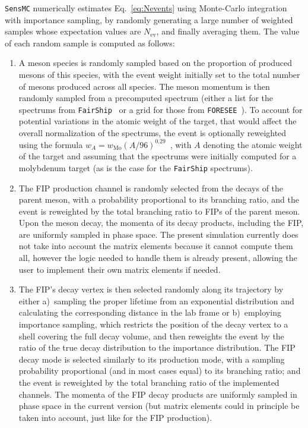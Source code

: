 \documentclass[
    aps,prd,
    twocolumn,
    nofootinbib,
    superscriptaddress,
]{revtex4}
\begin{document}
\texttt{SensMC} numerically estimates Eq.~\eqref{eq:Nevents} using Monte-Carlo integration with importance sampling, by randomly generating a large number of weighted samples whose expectation values are $N_{\mathrm{ev}}$, and finally averaging them. The value of each random sample is computed as follows:
\begin{enumerate}
\item A meson species is randomly sampled based on the proportion of produced mesons of this species, with the event weight initially set to the total number of mesons produced across all species. The meson momentum is then randomly sampled from a precomputed spectrum (either a list for the spectrums from \texttt{FairShip}~\cite{SHiP:2018xqw} or a grid for those from \texttt{FORESEE}~\cite{Kling:2021fwx}). To account for potential variations in the atomic weight of the target, that would affect the overall normalization of the spectrums, the event is optionally reweighted using the formula $w_A = w_{\mathrm{Mo}} (A/96)^{0.29}$~\cite{Carvalho:2003pza}, with $A$ denoting the atomic weight of the target and assuming that the spectrums were initially computed for a molybdenum target (as is the case for the \texttt{FairShip} spectrums).

\item The FIP production channel is randomly selected from the decays of the parent meson, with a probability proportional to its branching ratio, and the event is reweighted by the total branching ratio to FIPs of the parent meson. Upon the meson decay, the momenta of its decay products, including the FIP, are uniformly sampled in phase space. The present simulation currently does not take into account the matrix elements because it cannot compute them all, however the logic needed to handle them is already present, allowing the user to implement their own matrix elements if needed.

\item The FIP's decay vertex is then selected randomly along its trajectory by either a)~sampling the proper lifetime from an exponential distribution and calculating the corresponding distance in the lab frame or b)~employing importance sampling, which restricts the position of the decay vertex to a shell covering the full decay volume, and then reweights the event by the ratio of the true decay distribution to the importance distribution. The FIP decay mode is selected similarly to its production mode, with a sampling probability proportional (and in most cases equal) to its branching ratio; and the event is reweighted by the total branching ratio of the implemented channels. The momenta of the FIP decay products are uniformly sampled in phase space in the current version (but matrix elements could in principle be taken into account, just like for the FIP production).


\end{enumerate}
\end{document}
